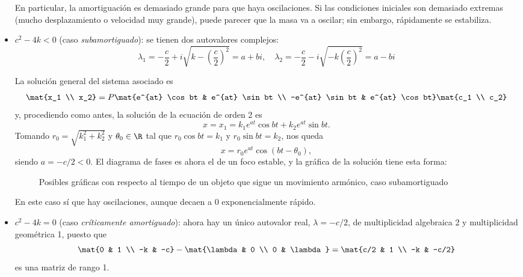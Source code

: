 \documentclass[../ecuaciones_diferenciales.tex]{subfiles}
\begin{document}
\begin{itemize}
	      En particular, la amortiguación es demasiado grande para que haya
	      oscilaciones. Si las condiciones iniciales son demasiado extremas (mucho
	      desplazamiento o velocidad muy grande), puede parecer que la masa va a
	      oscilar; sin embargo, rápidamente se estabiliza.
	\item \(c^2 - 4k < 0\) (caso \emph{subamortiguado}): se tienen dos autovalores
	      complejos:
	      \[\lambda_1 = -\frac{c}{2}+i\sqrt{k-\left(\frac{c}{2}\right)^2} = a + bi, \quad
		      \lambda_2 = -\frac{c}{2}-i\sqrt{-k\left(\frac{c}{2}\right)^2} = a - bi\]

	      La solución general del sistema asociado es
	      \[\mat{x_1 \\ x_2} = P \mat{e^{at} \cos bt & e^{at} \sin bt \\ -e^{at} \sin
		      bt & e^{at} \cos bt} \mat{c_1 \\ c_2}\]
	      y, procediendo como antes, la solución de la ecuación de orden 2 es
	      \[x = x_1 = k_1e^{at} \cos bt + k_2e^{at} \sin bt.\]
	      Tomando \(r_0 = \sqrt{k_1^2+k_2^2}\) y \(\theta_0 \in \R\) tal que \(r_0
	      \cos bt = k_1\) y \(r_0 \sin bt = k_2\), nos queda
	      \[x = r_0e^{at} \cos (bt - \theta_0),\]
	      siendo \(a = -c/2 < 0\). El diagrama de fases es ahora el de un foco
	      estable, y la gráfica de la solución tiene esta forma:
	      \begin{figure}[ht]
		      \centering
			\caption{Posibles gráficas con respecto al tiempo de un objeto que
			  sigue un movimiento armónico, caso subamortiguado}
	      \end{figure}

	      En este caso sí que hay oscilaciones, aunque decaen a 0 exponencialmente rápido.

	\item \(c^2-4k=0\) (caso \emph{críticamente amortiguado}): ahora hay un único
	      autovalor real, \(\lambda = -c/2\), de multiplicidad algebraica 2 y
	      multiplicidad geométrica 1, puesto que
	      \[\mat{0 & 1 \\ -k & -c} - \mat{\lambda & 0 \\ 0 & \lambda} = \mat{c/2 & 1
			      \\ -k & -c/2}\]
	      es una matriz de rango 1.


\end{itemize}
\end{document}

